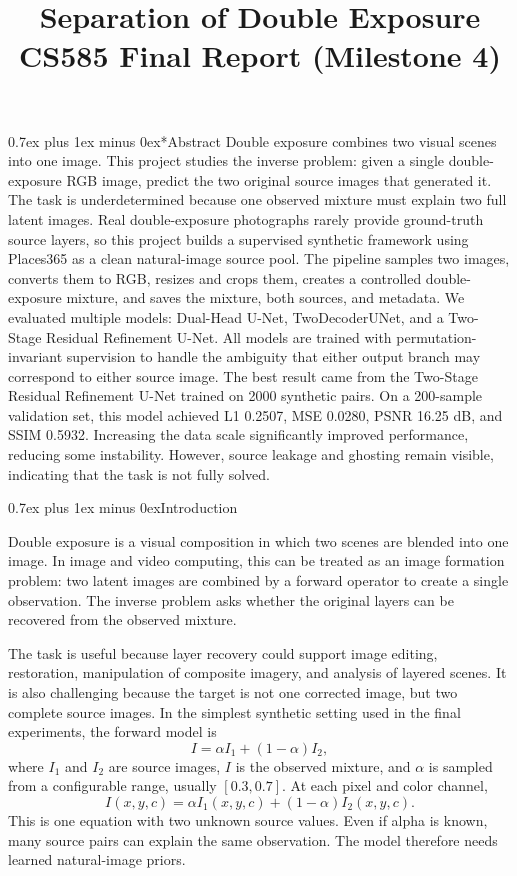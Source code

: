 \documentclass[conference]{IEEEtran}
\title{Separation of Double Exposure\\
\large CS585 Final Report (Milestone 4)}
\author{\IEEEauthorblockN{Vishal Singh}
\IEEEauthorblockA{Department of Computer Science\\
Boston University\\
vsingh03@bu.edu}}
\makeatletter
\def\section{\@startsection{section}{1}{\z@}{1.5ex plus 1.5ex minus 0.5ex}%
  {0.7ex plus 1ex minus 0ex}{\normalfont\normalsize\centering\scshape\bfseries}}
\makeatother
\begin{document}
\maketitle
\section*{Abstract}
Double exposure combines two visual scenes into one image. This project studies the inverse problem: given a single double-exposure RGB image, predict the two original source images that generated it. The task is underdetermined because one observed mixture must explain two full latent images. Real double-exposure photographs rarely provide ground-truth source layers, so this project builds a supervised synthetic framework using Places365 as a clean natural-image source pool. The pipeline samples two images, converts them to RGB, resizes and crops them, creates a controlled double-exposure mixture, and saves the mixture, both sources, and metadata. We evaluated multiple models: Dual-Head U-Net, TwoDecoderUNet, and a Two-Stage Residual Refinement U-Net. All models are trained with permutation-invariant supervision to handle the ambiguity that either output branch may correspond to either source image. The best result came from the Two-Stage Residual Refinement U-Net trained on 2000 synthetic pairs. On a 200-sample validation set, this model achieved L1 0.2507, MSE 0.0280, PSNR 16.25 dB, and SSIM 0.5932. Increasing the data scale significantly improved performance, reducing some instability. However, source leakage and ghosting remain visible, indicating that the task is not fully solved.

\section{Introduction}

Double exposure is a visual composition in which two scenes are blended into one image. In image and video computing, this can be treated as an image formation problem: two latent images are combined by a forward operator to create a single observation. The inverse problem asks whether the original layers can be recovered from the observed mixture.

The task is useful because layer recovery could support image editing, restoration, manipulation of composite imagery, and analysis of layered scenes. It is also challenging because the target is not one corrected image, but two complete source images. In the simplest synthetic setting used in the final experiments, the forward model is
\[
I = \alpha I_1 + (1-\alpha) I_2,
\]
where $I_1$ and $I_2$ are source images, $I$ is the observed mixture, and $\alpha$ is sampled from a configurable range, usually $[0.3,0.7]$. At each pixel and color channel,
\[
I(x,y,c)=\alpha I_1(x,y,c)+(1-\alpha)I_2(x,y,c).
\]
This is one equation with two unknown source values. Even if alpha is known, many source pairs can explain the same observation. The model therefore needs learned natural-image priors.
\end{document}
